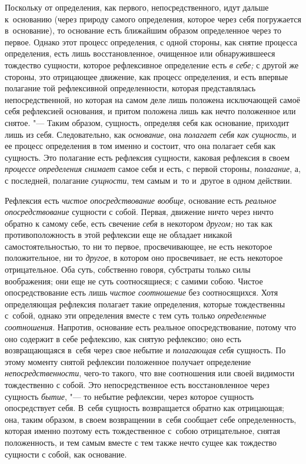 Поскольку от определения, как первого, непосредственного, идут дальше
к~основанию (через природу самого определения, которое через себя погружается
в~основание), то основание есть ближайшим образом определенное через то первое.
Однако этот процесс определения, с одной стороны, как снятие процесса
определения, есть лишь восстановленное, очищенное или обнаружившееся тождество
сущности, которое рефлексивное определение есть {\em в себе;} с другой же
стороны, это отрицающее движение, как процесс определения, и есть впервые
полагание той рефлексивной определенности, которая представлялась
непосредственной, но которая на самом деле лишь положена исключающей самоё себя
рефлексией основания, и притом положена лишь как нечто положенное или снятое.
"--- Таким образом, сущность, определяя себя как основание, приходит лишь из
себя. Следовательно, как {\em основание}, она {\em полагает себя как сущность},
и ее процесс определения в том именно и состоит, что она полагает себя как
сущность. Это полагание есть рефлексия сущности, каковая рефлексия в своем
{\em процессе определения снимает} самое себя и есть, с первой стороны,
{\em полагание}, а, с последней, полагание {\em сущности}, тем самым
и~то и~другое в одном действии.

Рефлексия есть {\em чистое опосредствование вообще}, основание есть
{\em реальное опосредствование} сущности с собой. Первая, движение ничто через
ничто обратно к самому себе, есть свечение {\em себя} в некотором {\em другом;}
но так как противоположность в этой рефлексии еще не обладает никакой
самостоятельностью, то ни то первое, просвечивающее, не есть некоторое
положительное, ни то {\em другое}, в котором оно просвечивает, не есть
некоторое отрицательное. Оба суть, собственно говоря, субстраты только силы
воображения; они еще не суть соотносящиеся; с самими собою. Чистое
опосредствование есть лишь {\em чистое соотношение} без соотносящихся. Хотя
определяющая рефлексия полагает такие определения, которые тождественны
с~собой, однако эти определения вместе с тем суть только {\em определенные
соотношения}. Напротив, основание есть реальное опосредствование, потому что
оно содержит в себе рефлексию, как снятую рефлексию; оно есть возвращающаяся
в~себя через свое небытие и {\em полагающая себя} сущность. По этому моменту
снятой рефлексии положенное получает определение {\em непосредственности},
чего-то такого, что вне соотношения или своей видимости тождественно с собой.
Это непосредственное есть восстановленное через сущность {\em бытие}, "--- то
небытие рефлексии, через которое сущность опосредствует себя. В~себя сущность
возвращается обратно как отрицающая; она, таким образом, в своем возвращении
в~себя сообщает себе определенность, которая именно поэтому есть тождественное
с~собою отрицательное, снятая положенность, и тем самым вместе с тем также
нечто сущее как тождество сущности с собой, как основание.

